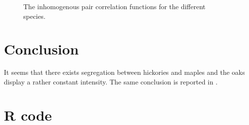 \documentclass[12pt,a4paper,oneside,article]{memoir}
\begin{document}
\begin{figure}[htbp]
  \begin{adjustwidth}{-2in}{-2in}
	  \centering
  \end{adjustwidth}
  \caption{The inhomogenous pair correlation functions for the different species.}
  \label{fig:ppcfi2}
\end{figure}

\clearpage


\section{Conclusion}

It seems that there exists segregation between hickories and maples and the oaks display
a rather constant intensity. The same conclusion is reported in \cite{perry}.


\printbibliography
\clearpage
\appendix
\section*{R code}


\end{document}
